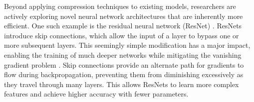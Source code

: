 Beyond applying compression techniques to existing models, researchers are actively exploring novel neural network architectures that are inherently more efficient.
One such example is the residual neural network (ResNet) \autocite{heDeepResidualLearning2015}.
ResNets introduce skip connections, which allow the input of a layer to bypass one or more subsequent layers.
This seemingly simple modification has a major impact, enabling the training of much deeper networks while mitigating the vanishing gradient problem \cite{pascanuDifficultyTrainingRecurrent2012}.
Skip connections provide an alternate path for gradients to flow during backpropagation, preventing them from diminishing excessively as they travel through many layers.
This allows ResNets to learn more complex features and achieve higher accuracy with fewer parameters. 

